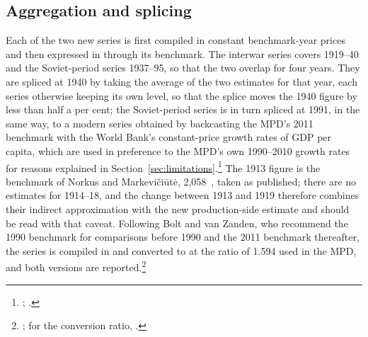 \subsection{Aggregation and splicing}

Each of the two new series is first compiled in constant benchmark-year prices and then expressed in \intlnineteen{} through its benchmark. The interwar series covers 1919--40 and the Soviet-period series 1937--95, so that the two overlap for four years. They are spliced at 1940 by taking the average of the two estimates for that year, each series otherwise keeping its own level, so that the splice moves the 1940 figure by less than half a per cent; the Soviet-period series is in turn spliced at 1991, in the same way, to a modern series obtained by backcasting the MPD's 2011 benchmark with the World Bank's constant-price growth rates of GDP per capita, which are used in preference to the MPD's own 1990--2010 growth rates for reasons explained in Section~\ref{sec:limitations}.\footnote{\autocite{mpd2023}; \autocite{wdi2024}.} The 1913 figure is the benchmark of Norkus and Markevi\v{c}i\={u}t\.{e}, 2,058~\intlnineteen{}, taken as published; there are no estimates for 1914--18, and the change between 1913 and 1919 therefore combines their indirect approximation with the new production-side estimate and should be read with that caveat. Following Bolt and van Zanden, who recommend the 1990 benchmark for comparisons before 1990 and the 2011 benchmark thereafter, the series is compiled in \intlnineteen{} and converted to \intltwenty{} at the ratio of 1.594 used in the MPD, and both versions are reported.\footnote{\autocite[30]{bolt_zanden_newgdp2021}; for the conversion ratio, \autocite{mpd2023}.}
